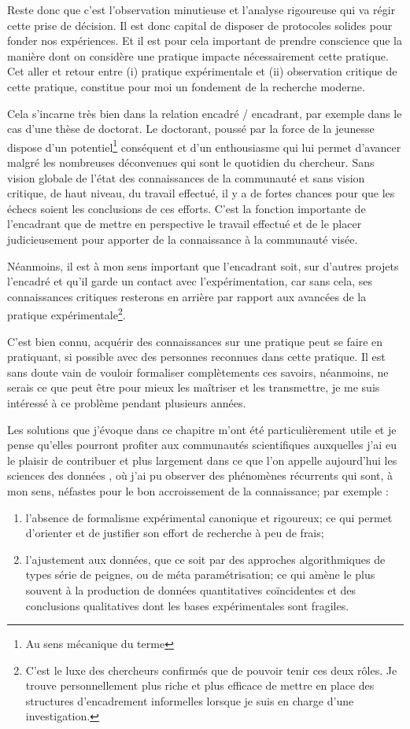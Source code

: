 Reste donc que c'est l'observation minutieuse et l'analyse rigoureuse qui va régir cette prise de décision. Il est donc capital de disposer de protocoles solides pour fonder nos expériences. Et il est pour cela important de prendre conscience que la manière dont on considère une pratique impacte nécessairement cette pratique. Cet aller et retour entre (i) pratique expérimentale et (ii) observation critique de cette pratique, constitue pour moi un fondement de la recherche moderne.

Cela s'incarne très bien dans la relation encadré / encadrant, par exemple dans le cas d'une thèse de doctorat. Le doctorant, poussé par la force de la jeunesse dispose d'un potentiel\footnote{Au sens mécanique du terme} conséquent et d'un enthousiasme qui lui permet d'avancer malgré les nombreuses déconvenues qui sont le quotidien du chercheur. Sans vision globale de l'état des connaissances de la communauté et sans vision critique, de haut niveau, du travail effectué, il y a de fortes chances pour que les échecs soient les conclusions de ces efforts. C'est la fonction importante de l'encadrant que de mettre en perspective le travail effectué et de le placer judicieusement pour apporter de la connaissance à la communauté visée.

Néanmoins, il est à mon sens important que l'encadrant soit, sur d'autres projets l'encadré et qu'il garde un contact avec l'expérimentation, car sans cela, ses connaissances critiques resterons en arrière par rapport aux avancées de la pratique expérimentale\footnote{C'est le luxe des chercheurs confirmés que de pouvoir tenir ces deux rôles. Je trouve personnellement plus riche et plus efficace de mettre en place des structures d'encadrement informelles lorsque je suis en charge d'une investigation.}.

C'est bien connu, acquérir des connaissances sur une pratique peut se faire en pratiquant, si possible avec des personnes reconnues dans cette pratique. Il est sans doute vain de vouloir formaliser complètements ces savoirs, néanmoins, ne serais ce que peut être pour mieux les maîtriser et les transmettre, je me suis intéressé à ce problème pendant plusieurs années.

Les solutions que j'évoque dans ce chapitre m'ont été particulièrement utile et je pense qu'elles pourront profiter aux communautés scientifiques auxquelles j'ai eu le plaisir de contribuer et plus largement dans ce que l'on appelle aujourd'hui \og les sciences des données \fg, où j'ai pu observer des phénomènes récurrents qui sont, à mon sens, néfastes pour le bon accroissement de la connaissance; par exemple :
\begin{enumerate}
  \item l'absence de formalisme expérimental canonique et rigoureux; ce qui permet d'orienter et de justifier son effort de recherche à peu de frais;
  \item l'ajustement aux données, que ce soit par des approches algorithmiques de types série de peignes, ou de méta paramétrisation; ce qui amène le plus souvent à la production de données quantitatives coïncidentes et des conclusions qualitatives dont les bases expérimentales sont fragiles.
\end{enumerate}

